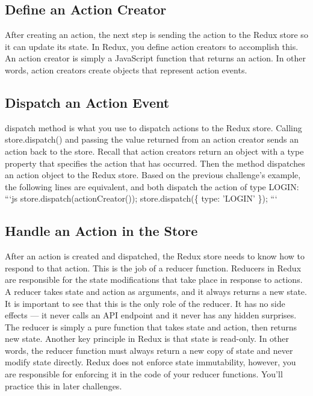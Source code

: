 \documentclass{article}%
\begin{document}
%
\subsection{Define an Action Creator}%
\label{subsec:DefineanActionCreator}%
After creating an action, the next step is sending the action to the Redux store so it can update its state. In Redux, you define action creators to accomplish this. An action creator is simply a JavaScript function that returns an action. In other words, action creators create objects that represent action events.\newline%

%
\subsection{Dispatch an Action Event}%
\label{subsec:DispatchanActionEvent}%
dispatch method is what you use to dispatch actions to the Redux store. Calling store.dispatch() and passing the value returned from an action creator sends an action back to the store.\newline%
Recall that action creators return an object with a type property that specifies the action that has occurred. Then the method dispatches an action object to the Redux store. Based on the previous challenge's example, the following lines are equivalent, and both dispatch the action of type LOGIN:\newline%
```js\newline%
store.dispatch(actionCreator());\newline%
store.dispatch(\{ type: 'LOGIN' \});\newline%
```\newline%

%
\subsection{Handle an Action in the Store}%
\label{subsec:HandleanActionintheStore}%
After an action is created and dispatched, the Redux store needs to know how to respond to that action. This is the job of a reducer function. Reducers in Redux are responsible for the state modifications that take place in response to actions. A reducer takes state and action as arguments, and it always returns a new state. It is important to see that this is the only role of the reducer. It has no side effects — it never calls an API endpoint and it never has any hidden surprises. The reducer is simply a pure function that takes state and action, then returns new state.\newline%
Another key principle in Redux is that state is read{-}only. In other words, the reducer function must always return a new copy of state and never modify state directly. Redux does not enforce state immutability, however, you are responsible for enforcing it in the code of your reducer functions. You'll practice this in later challenges.\newline%
\end{document}
